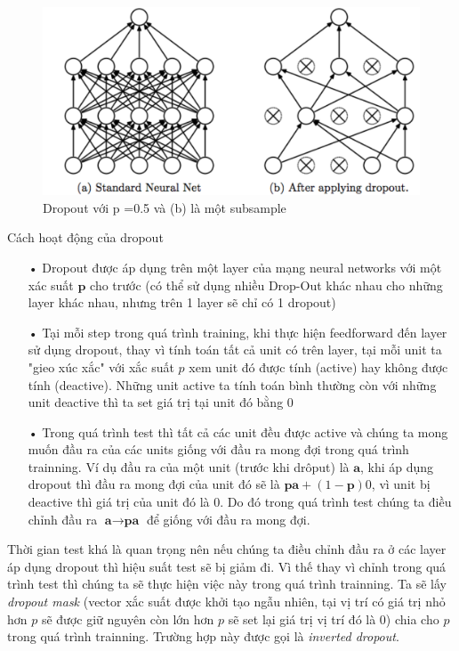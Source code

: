 \begin{enumerate}
\begin{center}
 	\begin{figure}[H]
    \begin{center}
    \includegraphics[scale=0.4]{chap3/image/dropout.png}
    \end{center}
    \caption{Dropout với p =0.5 và (b) là một subsample}
    \label{fig:dropout}
    \end{figure}
\end{center}

Cách hoạt động của dropout
\begin{itemize}
\item[•] Dropout được áp dụng trên một layer của mạng neural networks với một xác suất $\textbf{p}$ cho trước (có thể sử dụng nhiều Drop-Out khác nhau cho những layer khác nhau, nhưng trên 1 layer sẽ chỉ có 1 dropout)
\item[•] Tại mỗi step trong quá trình training, khi thực hiện feedforward đến layer sử dụng dropout, thay vì tính toán tất cả unit có trên layer, tại mỗi unit ta "gieo xúc xắc" với xắc suất $p$ xem unit đó được tính (active) hay không được tính (deactive). Những unit active ta tính toán bình thường còn với những unit deactive thì ta set giá trị tại unit đó bằng 0
\item[•] Trong quá trình test thì tất cả các unit đều được active và chúng ta mong muốn đầu ra của các units giống với đầu ra mong đợi trong quá trình trainning. Ví dụ đầu ra của một unit (trước khi drôput) là $\textbf{a}$, khi áp dụng dropout thì đầu ra mong đợi của unit đó sẽ là $\textbf{p}\textbf{a} + (1-\textbf{p})0$, vì unit bị deactive thì giá trị của unit đó là 0. Do đó trong quá trình test chúng ta điều chỉnh đầu ra $\textbf{a} \to \textbf{p}\textbf{a}$ để  giống với đầu ra mong đợi.
\end{itemize} \par
Thời gian test khá là quan trọng nên nếu chúng ta điều chỉnh đầu ra ở các layer áp dụng dropout thì hiệu suất test sẽ bị giảm đi. Vì thế thay vì chỉnh trong quá trình test thì chúng ta sẽ thực hiện việc này trong quá trình trainning. Ta sẽ lấy \textit{dropout mask} (vector xắc suất được khởi tạo ngẫu nhiên, tại vị trí có giá trị nhỏ hơn $p$ sẽ được giữ nguyên còn lớn hơn $p$ sẽ set lại giá trị vị trí đó là 0) chia cho $p$ trong quá trình trainning. Trường hợp này được gọi là \textit{inverted dropout}.
\end{enumerate}
